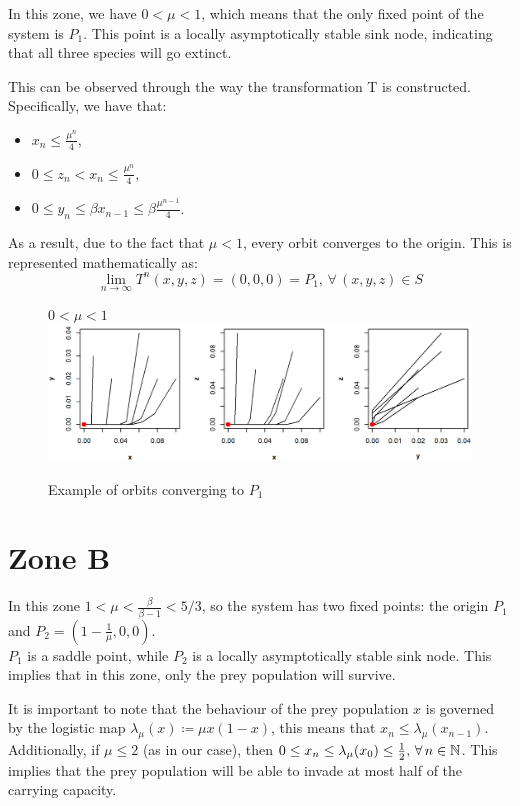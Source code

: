 \documentclass[10pt]{Configuration_Files/PoliMi3i_thesis}
\begin{document}
In this zone, we have $0<\mu<1$, which means that the only fixed point of the system is $P_1$. This point is a locally asymptotically stable sink node, indicating that all three species will go extinct.

This can be observed through the way the transformation T is constructed. Specifically, we have that:
\begin{itemize}
    \item  $x_n \leq \frac{\mu^n}{4}$, 
    \item $0\leq z_n <x_n  \leq \frac{\mu^n}{4}$,
    \item $0\leq y_n \leq \beta x_{n-1}  \leq \beta \frac{\mu^{n-1}}{4}$.
\end{itemize}

As a result, due to the fact that $\mu<1$, every orbit converges to the origin. This is represented mathematically as:
$$\lim_{n\to\infty} T^n(x,y,z) = (0,0,0) = P_1, \, \forall \, (x,y,z)\in S$$

\begin{figure}[!h]
\centering
\textbf{\footnotesize{$0<\mu<1$}}
    \includegraphics[width=1\linewidth]{images/Chapter 5/unnamed-chunk-3-1.png}     
   \caption{Example of orbits converging to $P_1$ \protect\footnotemark[1]}
\end{figure}


\section{Zone B}

In this zone $1<\mu<\frac{\beta}{\beta-1}<5/3$, so the system has two fixed points: the origin $P_1$ and $P_2 = (1 - \frac{1}{\mu}, 0, 0)$.
\\
$P_1$ is a saddle point, while $P_2$ is a locally asymptotically stable sink node. 
This implies that in this zone, only the prey population will survive.

It is important to note that the behaviour of the prey population $x$ is governed by the logistic map $\lambda_\mu(x) \coloneqq \mu x(1-x)$, this means that $x_n \leq \lambda_\mu(x_{n-1})$. Additionally, if $\mu\leq 2$ (as in our case), then $0\leq x_n \leq \lambda_\mu(x_0) \leq \frac{1}{2}, \, \forall \, n\in\mathbb{N}$. This implies that the prey population will be able to invade at most half of the carrying capacity.
\end{document}
